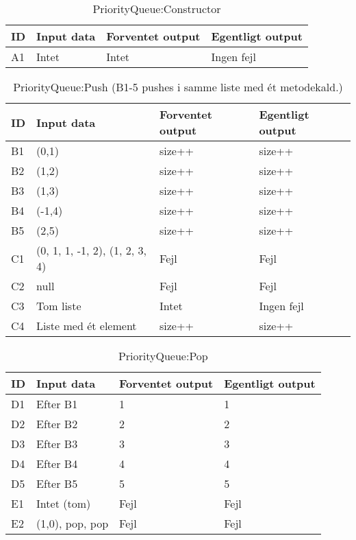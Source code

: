 
\begin{table}[h!]
	\caption{PriorityQueue:Constructor}
	\centering
	\begin{tabular}{L L L L}
		\hline\hline
		ID & Input data & Forventet output & Egentligt output \\ [0.375ex]
		\hline
		A1 & Intet & Intet & Ingen fejl\\
		\hline
	\end{tabular}
\end{table}

\begin{table}[h!]
	\caption{PriorityQueue:Push (B1-5 pushes i samme liste med ét metodekald.)}
	\centering
	\begin{tabular}{L L L L}
		\hline\hline
		ID & Input data & Forventet output & Egentligt output \\ [0.375ex]
		\hline
		B1 & (0,1) & size++ & size++\\
		B2 & (1,2) & size++ & size++\\
		B3 & (1,3) & size++ & size++\\
		B4 & (-1,4) & size++ & size++\\
		B5 & (2,5) & size++ & size++\\
		C1 & (0, 1, 1, -1, 2), (1, 2, 3, 4) & Fejl & Fejl\\
		C2 & null & Fejl & Fejl\\
		C3 & Tom liste & Intet & Ingen fejl\\
		C4 & Liste med ét element & size++ & size++\\
		\hline
	\end{tabular}
\end{table}

\begin{table}[h!]
	\caption{PriorityQueue:Pop}
	\centering
	\begin{tabular}{L L L L}
		\hline\hline
		ID & Input data & Forventet output & Egentligt output \\ [0.375ex]
		\hline
		D1 & Efter B1 & 1 & 1\\
		D2 & Efter B2 & 2 & 2\\
		D3 & Efter B3 & 3 & 3\\
		D4 & Efter B4 & 4 & 4\\
		D5 & Efter B5 & 5 & 5\\
		E1 & Intet (tom) & Fejl & Fejl\\
		E2 & (1,0), pop, pop & Fejl & Fejl\\
		\hline
	\end{tabular}
\end{table}

